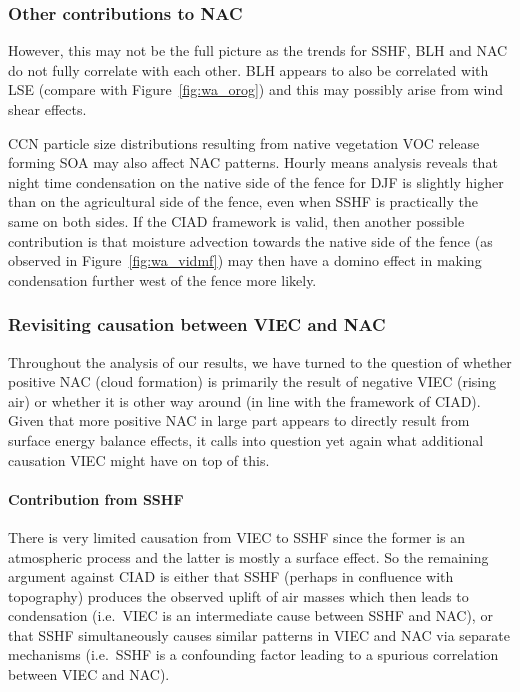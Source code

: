 \subsubsection{Other contributions to NAC}

However, this may not be the full picture as the trends for \ac{SSHF}, \ac{BLH} and \ac{NAC} do not fully correlate with each other. \ac{BLH} appears to also be correlated with \ac{LSE} (compare with Figure~\ref{fig:wa_orog}) and this may possibly arise from wind shear effects.

\ac{CCN} particle size distributions resulting from native vegetation \ac{VOC} release forming \ac{SOA} may also affect \ac{NAC} patterns. Hourly means analysis reveals that night time condensation on the native side of the fence for \ac{DJF} is slightly higher than on the agricultural side of the fence, even when \ac{SSHF} is practically the same on both sides. If the \ac{CIAD} framework is valid, then another possible contribution is that moisture advection towards the native side of the fence (as observed in Figure~\ref{fig:wa_vidmf}) may then have a domino effect in making condensation further west of the fence more likely.

\subsubsection{Revisiting causation between VIEC and NAC}

Throughout the analysis of our results, we have turned to the question of whether positive \ac{NAC} (cloud formation) is primarily the result of negative \ac{VIEC} (rising air) or whether it is other way around (in line with the framework of \ac{CIAD}). Given that more positive \ac{NAC} in large part appears to directly result from surface energy balance effects, it calls into question yet again what additional causation \ac{VIEC} might have on top of this.

\paragraph{Contribution from SSHF}

There is very limited causation from \ac{VIEC} to \ac{SSHF} since the former is an atmospheric process and the latter is mostly a surface effect. So the remaining argument against \ac{CIAD} is either that \ac{SSHF} (perhaps in confluence with topography) produces the observed uplift of air masses which then leads to condensation (i.e.\ \ac{VIEC} is an intermediate cause between \ac{SSHF} and \ac{NAC}), or that \ac{SSHF} simultaneously causes similar patterns in \ac{VIEC} and \ac{NAC} via separate mechanisms (i.e.\ \ac{SSHF} is a confounding factor leading to a spurious correlation between \ac{VIEC} and \ac{NAC}).

